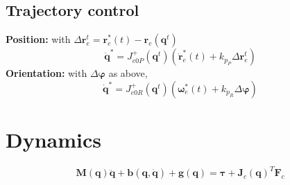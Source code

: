 \documentclass[a4paper, 8pt]{extarticle}
\begin{document}
\begin{multicols*}{3}
\subsection{Trajectory control}
\textbf{Position:} with $\Delta\mathbf r^t_e = \mathbf r^*_e(t) - \mathbf r_e(\mathbf q^t)$
$$\dot{\mathbf q}^* = J_{e0P}^+(\mathbf q^t) (\dot{\mathbf r}^*_e(t) + k_{p_P}\Delta\mathbf r^t_e)$$
\textbf{Orientation:} with $\Delta\bm\varphi$ as above,
$$\dot{\mathbf q}^* = J_{e0R}^+(\mathbf q^t) (\bm\omega^*_e(t) + k_{p_R}\Delta\bm\varphi)$$





\section{Dynamics}
$$\boxed{\mathbf{ M(q)\ddot{q} + b(q,\dot q) + g(q)} = 
\bm\tau + \mathbf{J}_c(\mathbf q)^T \mathbf F_c}$$


\end{multicols*}
\end{document}
